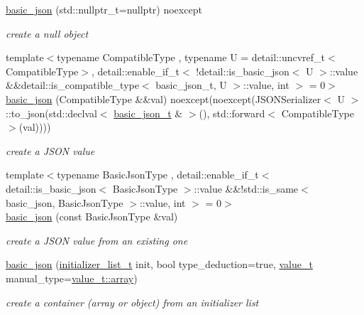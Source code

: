 \begin{DoxyCompactItemize}
\hyperlink{classnlohmann_1_1basic__json_ace6fbaf6c64f60b61922b5c9d3e61aa6}{basic\+\_\+json} (std\+::nullptr\+\_\+t=nullptr) noexcept
\begin{DoxyCompactList}\small\item\em create a null object \end{DoxyCompactList}\item 
{\footnotesize template$<$typename Compatible\+Type , typename U  = detail\+::uncvref\+\_\+t$<$\+Compatible\+Type$>$, detail\+::enable\+\_\+if\+\_\+t$<$ !detail\+::is\+\_\+basic\+\_\+json$<$ U $>$\+::value \&\&detail\+::is\+\_\+compatible\+\_\+type$<$ basic\+\_\+json\+\_\+t, U $>$\+::value, int $>$  = 0$>$ }\\\hyperlink{classnlohmann_1_1basic__json_a1b5d76a1546257689ad260ed34ec20b5}{basic\+\_\+json} (Compatible\+Type \&\&val) noexcept(noexcept(J\+S\+O\+N\+Serializer$<$ U $>$\+::to\+\_\+json(std\+::declval$<$ \hyperlink{classnlohmann_1_1basic__json_a125c0afa5f3599949b0589ef7b4aa322}{basic\+\_\+json\+\_\+t} \& $>$(), std\+::forward$<$ Compatible\+Type $>$(val))))
\begin{DoxyCompactList}\small\item\em create a J\+S\+ON value \end{DoxyCompactList}\item 
{\footnotesize template$<$typename Basic\+Json\+Type , detail\+::enable\+\_\+if\+\_\+t$<$ detail\+::is\+\_\+basic\+\_\+json$<$ Basic\+Json\+Type $>$\+::value \&\&!std\+::is\+\_\+same$<$ basic\+\_\+json, Basic\+Json\+Type $>$\+::value, int $>$  = 0$>$ }\\\hyperlink{classnlohmann_1_1basic__json_a40738eb9cb8c5a9ca14ae4b697c29f8e}{basic\+\_\+json} (const Basic\+Json\+Type \&val)
\begin{DoxyCompactList}\small\item\em create a J\+S\+ON value from an existing one \end{DoxyCompactList}\item 
\hyperlink{classnlohmann_1_1basic__json_aeac617faf3448d6d2cb33a020be01d37}{basic\+\_\+json} (\hyperlink{classnlohmann_1_1basic__json_a4d392f594e4c32345d47c2a175aad5c8}{initializer\+\_\+list\+\_\+t} init, bool type\+\_\+deduction=true, \hyperlink{namespacenlohmann_1_1detail_a1ed8fc6239da25abcaf681d30ace4985}{value\+\_\+t} manual\+\_\+type=\hyperlink{namespacenlohmann_1_1detail_a1ed8fc6239da25abcaf681d30ace4985af1f713c9e000f5d3f280adbd124df4f5}{value\+\_\+t\+::array})
\begin{DoxyCompactList}\small\item\em create a container (array or object) from an initializer list \end{DoxyCompactList}\item 

\end{DoxyCompactItemize}
